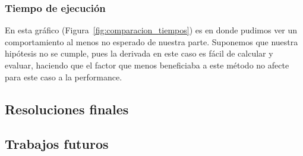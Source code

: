 \subsubsection{Tiempo de ejecución} %
\label{ssub:tiempo_de_ejecuci_n}

En esta gráfico (Figura~\ref{fig:comparacion_tiempos}) es en donde pudimos ver
un comportamiento al menos no esperado de nuestra parte. Suponemos que nuestra
hipótesis no se cumple, pues la derivada en este caso es fácil de calcular y
evaluar, haciendo que el factor que menos beneficiaba a este método no afecte
para este caso a la performance.



\subsection{Resoluciones finales} %
\label{sub:resoluciones_finales}


\subsection{Trabajos futuros} %
\label{sub:trabajos_futuros}

